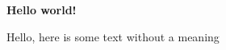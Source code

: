 \documentclass[../main.tex]{subfiles}
\begin{document}
\textbf{Hello world!}

Hello, here is some text without a meaning
\end{document}
